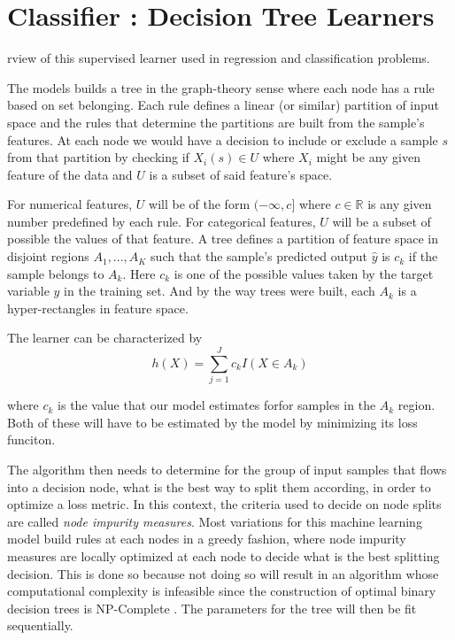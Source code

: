 \documentclass{article}%
\theoremstyle{definition}
\begin{document}
\section{Classifier : Decision Tree Learners}

rview of this supervised learner used in regression and classification problems.

The models builds a tree in the graph-theory sense where each node has a rule based on set belonging. Each rule defines a linear (or similar) partition of input space and the rules that determine the partitions are built from the sample's features. At each node we would have a decision to include or exclude a sample $s$ from that partition by checking if $X_i(s) \in U$ where $X_i$ might be any given feature of the data and $U$ is a subset of said feature's space.

For numerical features, $U$ will be of the form $(-\infty,c]$ where $c \in \mathbb{R}$ is any given number predefined by each rule. For categorical features, $U$ will be a subset of possible the values of that feature. A tree defines a partition of feature space in disjoint regions $A_1,...,A_K$ such that the sample's predicted output $\hat{y}$ is $c_k$ if the sample belongs to $A_k$. Here $c_k$ is one of the possible values taken by the target variable $y$ in the training set. And by the way trees were built, each $A_k$ is a hyper-rectangles in feature space.

The learner can be characterized by 
\[
h(X) = \sum_{j=1}^J c_k I(X \in A_k)
\]\label{equation-decisionTreeModel}

where $c_k$ is the value that our model estimates forfor samples in the $A_k$ region. Both of these will have to be estimated by the model by minimizing its loss funciton.

The algorithm then needs to determine for the group of input samples that flows into a decision node, what is the best way to split them according, in order to optimize a loss metric. In this context, the criteria used to decide on node splits are called \textit{node impurity measures}. Most variations for this machine learning model build rules at each nodes in a greedy fashion, where node impurity measures are locally optimized at each node to decide what is the best splitting decision. This is done so because not doing so will result in an algorithm whose computational complexity is infeasible since the construction of optimal binary decision trees is NP-Complete \cite{decisionTreesNP}. The parameters for the tree will then be fit sequentially.
\end{document}
